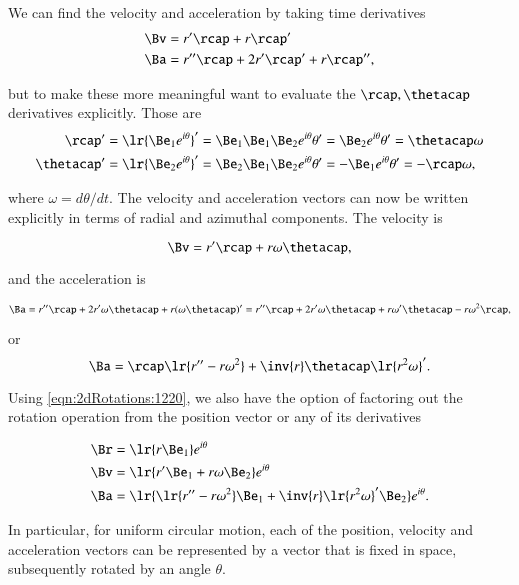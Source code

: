 {We can find the
velocity and acceleration by taking time derivatives
\begin{dmath}\label{eqn:2dRotations:1240}
\begin{aligned}
\Bv &= r' \rcap + r \rcap' \\
\Ba &= r'' \rcap + 2 r' \rcap' + r \rcap'',
\end{aligned}
\end{dmath}

but to make these more meaningful want to evaluate the \( \rcap, \thetacap \) derivatives explicitly.  Those are
\begin{equation}\label{eqn:2dRotations:1260}
\begin{aligned}
\rcap' &= \lr{ \Be_1 e^{i \theta} }' = \Be_1 \Be_1 \Be_2 e^{i\theta} \theta' = \Be_2 e^{i\theta} \theta' = \thetacap \omega \\
\thetacap' &= \lr{ \Be_2 e^{i \theta} }' = \Be_2 \Be_1 \Be_2 e^{i\theta} \theta' = -\Be_1 e^{i\theta} \theta' = -\rcap \omega,
\end{aligned}
\end{equation}

where \( \omega = d\theta/dt \).  The velocity and acceleration vectors can now be written explicitly in terms of radial and azimuthal components.  The velocity is

\begin{dmath}\label{eqn:2dRotations:1280}
\Bv = r' \rcap + r \omega \thetacap,
\end{dmath}

and the acceleration is

\begin{dmath}\label{eqn:2dRotations:1300}
\Ba
= r'' \rcap + 2 r' \omega \thetacap + r (\omega \thetacap)'
= r'' \rcap + 2 r' \omega \thetacap + r \omega' \thetacap - r \omega^2 \rcap,
\end{dmath}

or
\begin{dmath}\label{eqn:2dRotations:1320}
\Ba
= \rcap \lr{ r'' - r \omega^2 }
+ \inv{r} \thetacap \lr{ r^2 \omega }'.
\end{dmath}

Using \cref{eqn:2dRotations:1220}, we also have the option of factoring out the rotation operation from the position vector or any of its derivatives

\begin{dmath}\label{eqn:2dRotations:1360}
\begin{aligned}
\Br &= \lr{ r \Be_1 } e^{i \theta } \\
\Bv &= \lr{ r' \Be_1 + r \omega \Be_2 } e^{i \theta } \\
\Ba &= \lr{ \lr{ r'' - r \omega^2 } \Be_1 + \inv{r} \lr{ r^2 \omega }' \Be_2 } e^{i\theta}.
\end{aligned}
\end{dmath}

In particular,
for uniform circular motion, each of the position, velocity and acceleration vectors can be represented by a vector that is fixed in space, subsequently rotated by an angle \( \theta \).
} %

